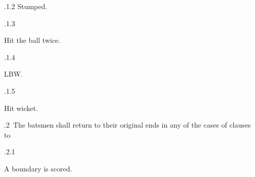 \documentclass[12pt]{article}
\begin{document}
\vspace{\baselineskip}
\begin{adjustwidth}{0.49in}{0.0in}
{\fontsize{9pt}{10.8pt}.1.2 \tabto{1.17in} Stumped.\par}\par

\end{adjustwidth}


\vspace{\baselineskip}
\begin{adjustwidth}{0.49in}{0.0in}
{\fontsize{9pt}{10.8pt}.1.3 \tabto{1.17in} {\fontsize{8pt}{9.6pt}\selectfont Hit the ball twice.\par}\par}\par

\end{adjustwidth}


\vspace{\baselineskip}
\begin{adjustwidth}{0.49in}{0.0in}
{\fontsize{9pt}{10.8pt}.1.4 \tabto{1.17in} {\fontsize{8pt}{9.6pt}\selectfont LBW.\par}\par}\par

\end{adjustwidth}


\vspace{\baselineskip}
\begin{adjustwidth}{0.49in}{0.0in}
{\fontsize{9pt}{10.8pt}.1.5 \tabto{1.17in} {\fontsize{8pt}{9.6pt}\selectfont Hit wicket.\par}\par}\par

\end{adjustwidth}


\vspace{\baselineskip}
{\fontsize{9pt}{10.8pt}.2\  The batsmen shall return to their original ends in any of the cases of clauses to \par}\par


\vspace{\baselineskip}
\begin{adjustwidth}{0.49in}{0.0in}
{\fontsize{9pt}{10.8pt}.2.1 \tabto{1.17in} {\fontsize{8pt}{9.6pt}\selectfont A boundary is scored.\par}\par}\par

\end{adjustwidth}
\end{document}
